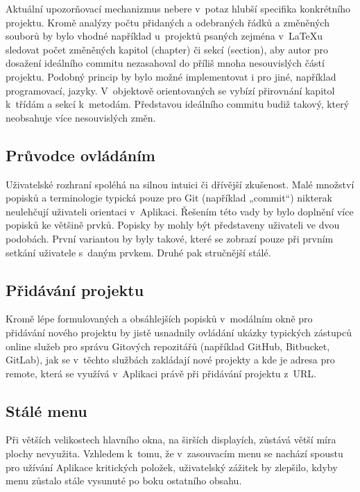 Aktuální upozorňovací mechanizmus nebere v~potaz hlubší specifika konkrétního projektu. Kromě analýzy počtu přidaných a odebraných řádků a změněných souborů by bylo vhodné například u~projektů psaných zejména v~\LaTeX{u} sledovat počet změněných kapitol (chapter) či sekcí (section), aby autor pro dosažení ideálního commitu nezasahoval do příliš mnoha nesouvislých částí projektu. Podobný princip by bylo možné implementovat i pro jiné, například programovací, jazyky. V~objektově orientovaných se vybízí přirovnání kapitol k~třídám a sekcí k~metodám. Představou ideálního commitu budiž takový, který neobsahuje více nesouvislých změn.

\subsection{Průvodce ovládáním}

Uživatelské rozhraní spoléhá na silnou intuici či dřívější zkušenost. Malé množství popisků a terminologie typická pouze pro Git (například „commit“) nikte\-rak neulehčují uživateli orientaci v~Aplikaci. Řešením této vady by bylo doplnění více popisků ke většině prvků. Popisky by mohly být představeny uživateli ve dvou podobách. První variantou by byly takové, které se zobrazí pouze při prvním setkání uživatele s~daným prvkem. Druhé pak stručnější stálé.

\subsection{Přidávání projektu}

Kromě lépe formulovaných a obsáhlejších popisků v~modálním okně pro přidávání nového projektu by jistě usnadnily ovládání ukázky typických zástupců online služeb pro správu Gitových repozitářů (například GitHub, Bitbucket, GitLab), jak se v~těchto službách zakládají nové projekty a kde je adresa pro remote, která se využívá v~Aplikaci právě při přidávání projektu z~URL.

\subsection{Stálé menu}

Při větších velikostech hlavního okna, na širších displayích, zůstává větší míra plochy nevyužita. Vzhledem k~tomu, že v~zasouvacím menu se nachází spoustu pro užívání Aplikace kritických položek, uživatelský zážitek by zlepšilo, kdyby menu zůstalo stále vysunuté po boku ostatního obsahu.

